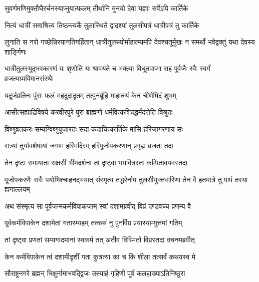 \twolineshloka
{सुवर्णमणिमुक्तौघैरर्चनस्याप्नुयात्फलम्}
{तीर्थानि मुनयो देवा यज्ञाः सर्वेऽपि कार्तिके} %

\twolineshloka
{नित्यं धात्रीं समाश्रित्य तिष्ठन्त्यर्के तुलास्थिते}
{द्वादश्यां तुलसीपत्रं धात्रीपत्रं तु कार्तिके} %

\threelineshloka
{लुनाति स नरो गच्छेन्निरयानतिगर्हितान्}
{धात्रीतुलस्योर्माहात्म्यमपि देवश्चतुर्मुखः}
{न समर्थो भवेद्वक्तुं यथा देवस्य शार्ङ्गिणः} %

\fourlineindentedshloka
{धात्रीतुलस्युद्भवकारणं यः}
{शृणोति यः श्रावयते च भक्त्या}
{विधूतपाप्मा सह पूर्वजैः स्वैः}
{स्वर्गं व्रजत्यग्र्यविमानसंस्थैः} %





\twolineshloka
{यदूर्जव्रतिनः पुंसः फलं महदुदादृतम्}
{तत्पुनर्ब्रूहि माहात्म्यं केन चीर्णमिदं शुभम्} %


\twolineshloka
{आसीत्सह्याद्रिविषये करवीरपुरे पुरा}
{ब्राह्मणो धर्मवित्कश्चिद्धर्मदत्तेति विश्रुतः} %

\twolineshloka
{विष्णुव्रतकरः सम्यग्विष्णुपूजारतः सदा}
{कदाचित्कार्तिके मासि हरिजागरणाय सः} %

\twolineshloka
{रात्र्यां तुर्यावशेषायां जगाम हरिमदिरम्}
{हरिपूजोपकरणान् प्रगृह्य व्रजता तदा} %

\twolineshloka
{तेन दृष्टा समायाता राक्षसी भीमदर्शना}
{तां दृष्ट्वा भयवित्रस्तः कम्पितावयवस्तदा} %

\threelineshloka
{पूजोपकरणैः सर्वैः पयोभिश्चाहनद्भयात्}
{संस्मृत्य तद्धरेर्नाम तुलसीयुक्तवारिणा}
{तेन वै हतमात्रे तु पापं तस्या ह्यगाल्लयम्} %

\twolineshloka
{अथ संस्मृत्य सा पूर्वजन्मकर्मविपाकजाम्}
{स्वां दशामब्रवीद् विप्रं दण्डवच्च प्रणम्य वै} %


\twolineshloka
{पूर्वकर्मविपाकेन दशामेतां गतास्म्यहम्}
{तत्कथं नु पुनर्विप्र प्रयास्याम्युत्तमां गतिम्} %


\twolineshloka
{तां दृष्ट्वा प्रणतां सम्यग्वदमानां स्वकर्म तत्}
{अतीव विस्मितो विप्रस्तदा वचनमब्रवीत्} %

\twolineshloka
{केन कर्मविपाकेन त्वं दशामीदृशीं गता}
{कुत्रत्या का च किं शीला तत्सर्वं कथयस्व मे} %


\twolineshloka
{सौराष्ट्रनगरे ब्रह्मन् भिक्षुर्नामाभवद्द्विजः}
{तस्याहं गृहिणी पूर्वं कलहाख्याऽतिनिष्ठुरा} %

